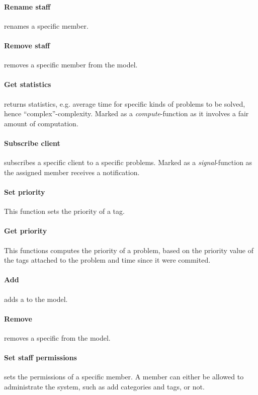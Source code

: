 \paragraph{Rename staff} renames a specific \astaff[] member. 

\paragraph{Remove staff} removes a specific \astaff[] member from the model. 


\paragraph{Get statistics} returns statistics, e.g. average time for specific kinds of problems to be solved, hence ``complex''-complexity. Marked as a \textit{compute}-function as it involves a fair amount of computation.
\paragraph{Subscribe client} subscribes a specific client to a specific problems. Marked as a \textit{signal}-function as the assigned \astaff[] member receives a notification. 

\paragraph{Set priority} This function sets the priority of a tag. 
\paragraph{Get priority} This functions computes the priority of a problem, based on the priority value of the tags attached to the problem and time since it were commited.

\paragraph{Add \client[]} adds a \client[] to the model. 

\paragraph{Remove \client[]} removes a specific \client[] from the model. 

\paragraph{Set staff permissions} sets the permissions of a specific \astaff[] member. A \astaff[] member can either be allowed to administrate the system, such as add categories and tags, or not. 

